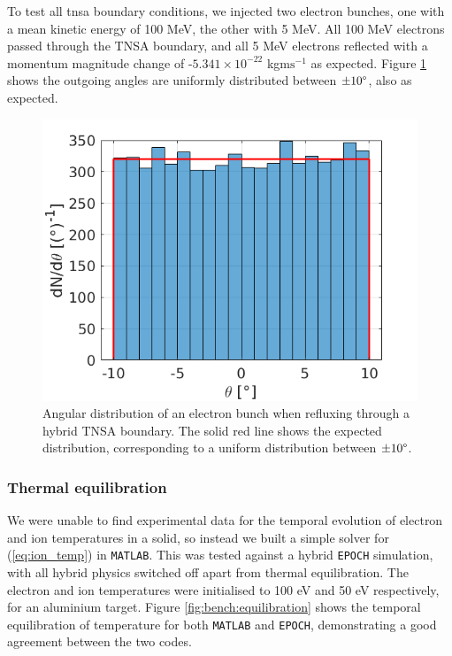 \documentclass[12pt]{article}
\numberwithin{equation}{section}
\begin{document}
To test all tnsa boundary conditions, we injected two electron bunches, one with a mean kinetic energy of 100 MeV, the other with 5 MeV. All 100 MeV electrons passed through the TNSA boundary, and all 5 MeV electrons reflected with a momentum magnitude change of -$5.341\times 10^{-22}$ kgm$\text{s}^{-1}$ as expected. Figure \ref{fig:bench:tnsa} shows the outgoing angles are uniformly distributed between $\pm 10\degree$, also as expected.

\begin{figure}
\centering
  \includegraphics[width=0.6\linewidth]{Figures/bench_tnsa.png}
\caption{Angular distribution of an electron bunch when refluxing through a hybrid TNSA boundary. The solid red line shows the expected distribution, corresponding to a uniform distribution between $\pm 10\degree$.}
\label{fig:bench:tnsa}
\end{figure}

\subsubsection{Thermal equilibration} \label{sec:bench:Equilibration}

We were unable to find experimental data for the temporal evolution of electron and ion temperatures in a solid, so instead we built a simple solver for (\ref{eq:ion_temp}) in \texttt{MATLAB}. This was tested against a hybrid \texttt{EPOCH} simulation, with all hybrid physics switched off apart from thermal equilibration. The electron and ion temperatures were initialised to 100 eV and 50 eV respectively, for an aluminium target. Figure \ref{fig:bench:equilibration} shows the temporal equilibration of temperature for both \texttt{MATLAB} and \texttt{EPOCH}, demonstrating a good agreement between the two codes.
\end{document}
